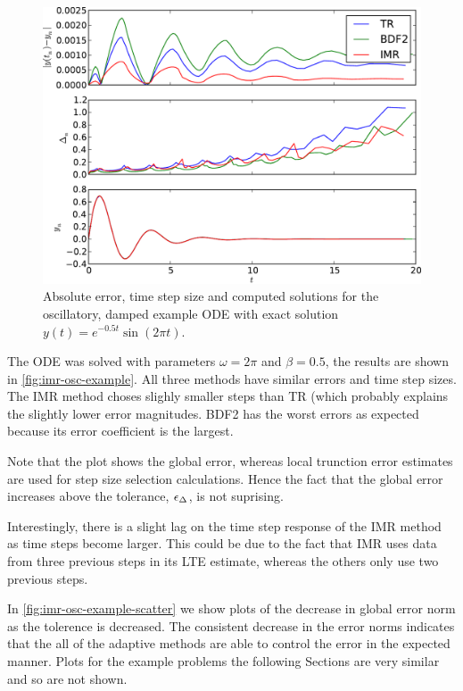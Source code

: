 \begin{figure}[\figpos]
  \centering \includegraphics[width=1\textwidth]{plots/aimr_odes/damped_oscillation-errornormsvs-dtsvs-tracevaluesvstimes}
  \caption{Absolute error, time step size and computed solutions for the oscillatory, damped example ODE with exact solution $y(t) = e^{-0.5t} \sin(2\pi t)$.}
  \label{fig:imr-osc-example}
\end{figure}

The ODE was solved with parameters $\omega = 2 \pi$ and $\beta = 0.5$, the results are shown in \autoref{fig:imr-osc-example}.
All three methods have similar errors and time step sizes.
The IMR method choses slighly smaller steps than TR (which probably explains the slightly lower error magnitudes.
BDF2 has the worst errors as expected because its error coefficient is the largest.

Note that the plot shows the global error, whereas local trunction error estimates are used for step size selection calculations.
Hence the fact that the global error increases above the tolerance, $\epsilon_{\Delta_{}}$, is not suprising.

Interestingly, there is a slight lag on the time step response of the IMR method as time steps become larger.
This could be due to the fact that IMR uses data from three previous steps in its LTE estimate, whereas the others only use two previous steps.

In \autoref{fig:imr-osc-example-scatter} we show plots of the decrease in global error norm as the tolerence is decreased. 
The consistent decrease in the error norms indicates that the all of the adaptive methods are able to control the error in the expected manner.
Plots for the example problems the following Sections are very similar and so are not shown.

